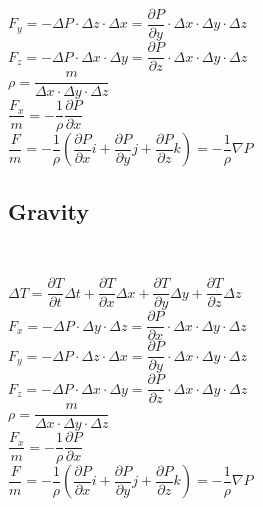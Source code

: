 \documentclass[a4paper]{article}
\begin{document}
$ F_{y} = - \Delta P \cdot \Delta z \cdot \Delta x 
= \dfrac{\partial P}{\partial y} \cdot \Delta x \cdot \Delta y \cdot \Delta z $\\

$ F_{z} = - \Delta P \cdot \Delta x \cdot \Delta y 
= \dfrac{\partial P}{\partial z} \cdot \Delta x \cdot \Delta y \cdot \Delta z $\\

$ \rho = \dfrac {m}{\Delta x \cdot \Delta y \cdot \Delta z} $ \\

$ \dfrac {F_{x}}{m} = - \dfrac{1}{\rho} \dfrac{\partial P}{\partial x} $ \\

$ \dfrac {F}{m} = - \dfrac{1}{\rho} \left( \dfrac{\partial P}{\partial x} i + \dfrac{\partial P}{\partial y} j + \dfrac{\partial P}{\partial z} k \right) 
= - \dfrac{1}{\rho} \nabla P$ \\


\subsection{Gravity}\

$ \Delta T = \dfrac{\partial T}{\partial t} \Delta t 
+ \dfrac{\partial T}{\partial x} \Delta x 
+ \dfrac{\partial T}{\partial y} \Delta y 
+ \dfrac{\partial T}{\partial z} \Delta z $\\

$ F_{x} = - \Delta P \cdot \Delta y \cdot \Delta z 
= \dfrac{\partial P}{\partial x} \cdot \Delta x \cdot \Delta y \cdot \Delta z $\\

$ F_{y} = - \Delta P \cdot \Delta z \cdot \Delta x 
= \dfrac{\partial P}{\partial y} \cdot \Delta x \cdot \Delta y \cdot \Delta z $\\

$ F_{z} = - \Delta P \cdot \Delta x \cdot \Delta y 
= \dfrac{\partial P}{\partial z} \cdot \Delta x \cdot \Delta y \cdot \Delta z $\\

$ \rho = \dfrac {m}{\Delta x \cdot \Delta y \cdot \Delta z} $ \\

$ \dfrac {F_{x}}{m} = - \dfrac{1}{\rho} \dfrac{\partial P}{\partial x} $ \\

$ \dfrac {F}{m} = - \dfrac{1}{\rho} \left( \dfrac{\partial P}{\partial x} i + \dfrac{\partial P}{\partial y} j + \dfrac{\partial P}{\partial z} k \right) 
= - \dfrac{1}{\rho} \nabla P$ \\
\end{document}
